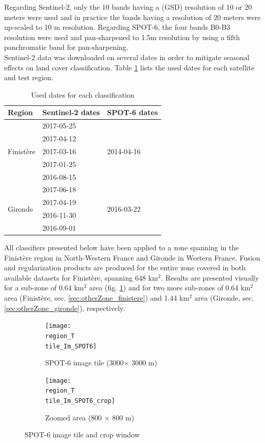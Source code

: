 \documentclass[10pt]{article}
\newcommand{\tile}{41000_30000}
\newcommand{\region}{finistere}
\begin{document}
Regarding Sentinel-2, only the 10 bands having a (GSD) resolution of 10 or 20 meters were used and in practice the bands having a resolution of 20 meters were up-scaled to 10 m resolution. Regarding SPOT-6, the four bands B0-B3 resolution were used and pan-sharpened to 1.5m resolution by using a fifth panchromatic band for pan-sharpening. \\

Sentinel-2 data was downloaded on several dates in order to mitigate seasonal effects on land cover classification. Table \ref{table:dates} lists the used dates for each satellite and test region.
\begin{table}[H]
\centering
\begin{tabular}{lll}\toprule
Region & Sentinel-2 dates & SPOT-6 dates \\\hline
\multirow{5}{*}{Finistère} & 2017-05-25 & \multirow{5}{*}{2014-04-16} \\
 & 2017-04-12 &  \\
 & 2017-03-16 &  \\
 & 2017-01-25 &  \\
 & 2016-08-15 &  \\\hline
\multirow{4}{*}{Gironde} & 2017-06-18 & \multirow{4}{*}{2016-03-22} \\
 & 2017-04-19 &  \\
 & 2016-11-30 &  \\
 & 2016-09-01 &  \\\bottomrule
\end{tabular}
\caption{Used dates for each classification}
\label{table:dates}
\end{table}

All classifiers presented below have been applied to a zone spanning in the Finistère region in North-Western France and Gironde in Western France. Fusion and regularization products are produced for the entire zone covered in both available datasets for Finistère, spanning 648 km$^2$. Results are presented visually for a sub-zone of 0.64 km$^2$ area (fig.  \ref{fig:area\tile}) and for two more sub-zones of 0.64 km$^2$ area (Finistère, sec. \ref{sec:otherZone_finistere}) and 1.44 km$^2$ area (Gironde, sec. \ref{sec:otherZone_gironde}), respectively.
\newcommand{\figureTile}{
\begin{figure}[H]
    \centering
    \begin{subfigure}{0.49\textwidth}
        \centering
        \texttt{[image: \\region\_T\\tile\_Im\_SPOT6]}
        \caption{SPOT-6 image tile (3000$\times$ 3000 m)}
    \end{subfigure}
    \hfill
    \begin{subfigure}{0.49\textwidth}
        \centering
        \texttt{[image: \\region\_T\\tile\_Im\_SPOT6\_crop]}
        \caption{Zoomed area (800 $\times$ 800 m)}
    \end{subfigure}
    \caption{SPOT-6 image tile and crop window}
    \label{fig:area\tile}
    \centering
\end{figure}
}
\figureTile
\end{document}

